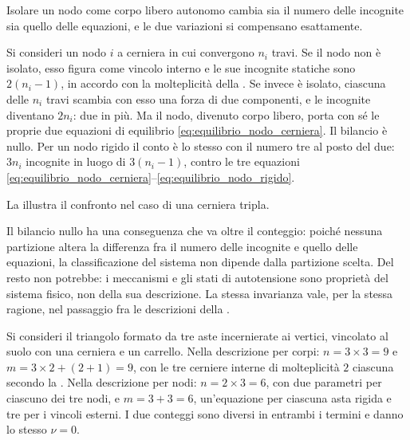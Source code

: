 Isolare un nodo come corpo libero autonomo cambia sia il
numero delle incognite sia quello delle equazioni, e le due
variazioni si compensano esattamente.

Si consideri un nodo $i$ a cerniera in cui convergono $n_i$
travi. Se il nodo non è isolato, esso figura come vincolo
interno e le sue incognite statiche sono $2(n_i - 1)$, in
accordo con la molteplicità della . Se
invece è isolato, ciascuna delle $n_i$ travi scambia con
esso una forza di due componenti, e le incognite diventano
$2n_i$: due in più. Ma il nodo, divenuto corpo libero,
porta con sé le proprie due equazioni di equilibrio
\eqref{eq:equilibrio_nodo_cerniera}. Il bilancio è nullo.
Per un nodo rigido il conto è lo stesso con il numero tre
al posto del due: $3n_i$ incognite in luogo di
$3(n_i - 1)$, contro le tre equazioni
\eqref{eq:equilibrio_nodo_cerniera}--\eqref{eq:equilibrio_nodo_rigido}.

La  illustra il confronto nel
caso di una cerniera tripla.





Il bilancio nullo ha una conseguenza che va oltre il
conteggio: poiché nessuna partizione altera la differenza
fra il numero delle incognite e quello delle equazioni, la
classificazione del sistema non dipende dalla partizione
scelta. Del resto non potrebbe: i meccanismi e gli stati di
autotensione sono proprietà del sistema fisico, non della
sua descrizione. La stessa invarianza vale, per la stessa
ragione, nel passaggio fra le descrizioni della
.

\begin{oss}
	Si consideri il triangolo formato da tre aste
	incernierate ai vertici, vincolato al suolo con una
	cerniera e un carrello. Nella descrizione per corpi:
	$n = 3 \times 3 = 9$ e $m = 3\times 2 + (2+1) = 9$, con
	le tre cerniere interne di molteplicità $2$ ciascuna
	secondo la . Nella descrizione per
	nodi: $n = 2 \times 3 = 6$, con due parametri per
	ciascuno dei tre nodi, e $m = 3 + 3 = 6$, un'equazione
	per ciascuna asta rigida e tre per i vincoli esterni.
	I due conteggi sono diversi in entrambi i termini e danno
	lo stesso $\nu = 0$.
\end{oss}


